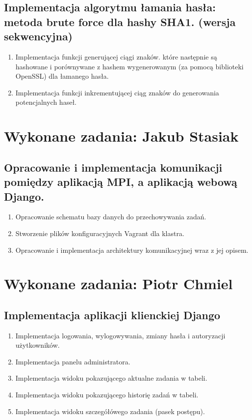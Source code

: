 \documentclass[a4paper,10pt]{article}
\begin{document}
\subsection{Implementacja algorytmu łamania hasła: metoda brute force dla hashy SHA1. (wersja sekwencyjna)}

\begin{enumerate}
	\item Implementacja funkcji generującej ciągi znaków. które następnie są hashowane i porównywane z hashem wygenerowanym (za pomocą biblioteki OpenSSL) dla łamanego hasła.
	\item Implementacja funkcji inkrementującej ciąg znaków do generowania potencjalnych haseł. 
	
\end{enumerate}

\section{Wykonane zadania: Jakub Stasiak}

\subsection{Opracowanie i implementacja komunikacji pomiędzy aplikacją MPI, a aplikacją webową Django.}

\begin{enumerate}
	\item Opracowanie schematu bazy danych do przechowywania zadań.
	\item Stworzenie plików konfiguracyjnych Vagrant dla klastra.
	\item Opracowanie i implementacja architektury komunikacyjnej wraz z jej opisem.
\end{enumerate}

\section{Wykonane zadania: Piotr Chmiel}

\subsection{Implementacja aplikacji klienckiej Django}

\begin{enumerate}
	\item Implementacja logowania, wylogowywania, zmiany hasła i autoryzacji użytkowników.
	\item Implementacja panelu administratora.
	\item Implementacja widoku pokazującego aktualne zadania w tabeli.
	\item Implementacja widoku pokazującego historię zadań w tabeli.
	\item Implementacja widoku szczegółówego zadania (pasek postępu).
\end{enumerate}
\end{document}
